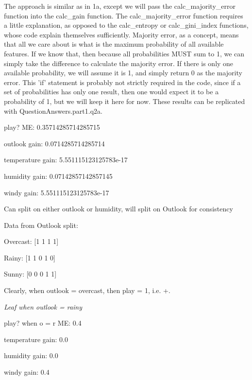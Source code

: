 \documentclass[12pt, fullpage,letterpaper]{article}
\begin{document}
\begin{enumerate}
\begin{enumerate}
	The approach is similar as in 1a, except we will pass the calc\_majority\_error function into the calc\_gain function. The calc\_majority\_error function requires a little explanation, as opposed to the calc\_entropy or calc\_gini\_index functions, whose code explain themselves sufficiently. Majority error, as a concept, means that all we care about is what is the maximum probability of all available features. If we know that, then because all probabilities MUST sum to 1, we can simply take the difference to calculate the majority error. If there is only one available probability, we will assume it is 1, and simply return 0 as the majority error. This 'if' statement is probably not strictly required in the code, since if a set of probabilities has only one result, then one would expect it to be a probability of 1, but we will keep it here for now. These results can be replicated with QuestionAnswers.part1.q2a.
	
    \vspace{5mm}

	play? ME:  0.35714285714285715
	
    outlook gain: 0.0714285714285714
    
    temperature gain: 5.551115123125783e-17
    
    humidity gain: 0.07142857142857145
    
    windy gain: 5.551115123125783e-17
    
    \vspace{5mm}

    Can split on either outlook or humidity, will split on Outlook for consistency
    
    \vspace{5mm}
    
    Data from Outlook split:
    
    Overcast: [1 1 1 1]
    
    Rainy: [1 1 0 1 0]
    
    Sunny: [0 0 0 1 1]
    
    Clearly, when outlook = overcast, then play = 1, i.e. +.
    
    \vspace{5mm}
    \emph{Leaf when outlook = rainy}
    
    play? when o = r ME:  0.4
    
    temperature gain: 0.0
    
    humidity gain: 0.0
    
    windy gain: 0.4
    

\end{enumerate}
\end{enumerate}
\end{document}
